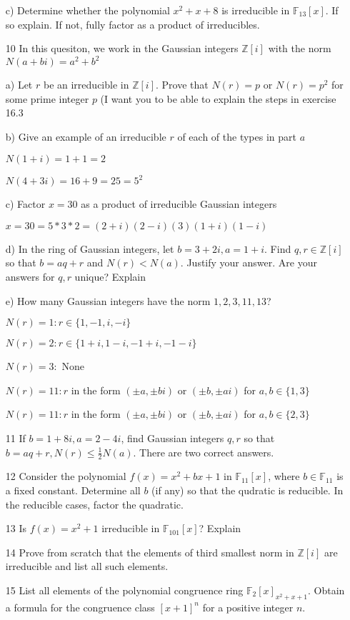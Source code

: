\documentclass[12pt]{article}
\begin{document}
\begin{itemize}
		c) Determine whether the polynomial $x^2 + x + 8$ is irreducible in $\mathbb{F}_{13}[x]$. If so explain. If not, fully factor as a product of irreducibles.

	\item[10] In this quesiton, we work in the Gaussian integers $\mathbb{Z}[i]$  with the norm $N(a+bi) = a^2 + b^2$

		a) Let $r$ be an irreducible in $\mathbb{Z}[i]$. Prove that $N(r) = p$ or $N(r) = p^2$ for some prime integer $p$ (I want you to be able to explain the steps in exercise 16.3

		b) Give an example of an irreducible $r$ of each of the types in part $a$

		$N(1+i) = 1 + 1 = 2$

		$N(4 + 3i) = 16 + 9 = 25 = 5^2$

		c) Factor $x = 30$ as a product of irreducible Gaussian integers

		$x = 30 = 5 * 3 * 2 = (2 + i)(2-i)(3)(1+i)(1-i)$

		d) In the ring of Gaussian integers, let $b = 3 + 2i, a = 1+ i$. Find $q,r \in \mathbb{Z}[i]$ so that $b = aq + r$ and $N(r) < N(a)$. Justify your answer. Are your answers for $q,r$ unique? Explain

		e) How many Gaussian integers have the norm $1,2,3,11,13$?

		$N(r) = 1: r \in \{1, -1, i, -i\}$

		$N(r) = 2: r \in \{1+i, 1-i, -1+i, -1 - i\}$

		$N(r) = 3:$ None

		$N(r) = 11: r$ in the form $(\pm a, \pm b i)$ or $(\pm b, \pm a i)$ for $a,b \in \{1, 3\}$

		$N(r) = 11: r$ in the form $(\pm a, \pm b i)$ or $(\pm b, \pm a i)$ for $a,b \in \{2, 3\}$

	\item[11] If $b = 1 + 8i, a = 2-4i$, find Gaussian integers $q,r$ so that $b = aq + r, N(r) \leq \frac{1}{2} N(a)$. There are two correct answers.

	\item[12] Consider the polynomial $f(x) = x^2 + bx + 1$ in $\mathbb{F}_{11}[x]$, where $b\in \mathbb{F}_{11}$ is a fixed constant. Determine all $b$ (if any) so that the qudratic is reducible. In the reducible cases, factor the quadratic.

	\item[13] Is $f(x) = x^2 + 1$ irreducible in $\mathbb{F}_{101}[x]$? Explain

	\item[14] Prove from scratch that the elements of third smallest norm in $\mathbb{Z}[i]$ are irreducible and list all such elements.

	\item[15] List all elements of the polynomial congruence ring $\mathbb{F}_2[x]_{x^2 + x + 1}$. Obtain a formula for the congruence class $[x+1]^n$ for a positive integer $n$.
\end{itemize}
\end{document}
